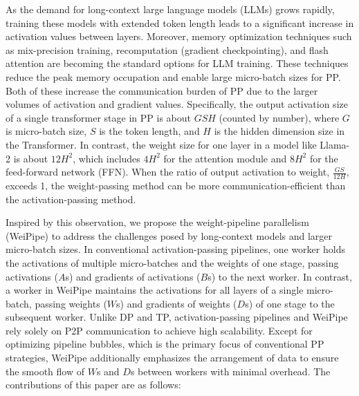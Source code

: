 \documentclass[sigplan,review]{acmart}
\begin{document}
As the demand for long-context large language models (LLMs) grows rapidly, training these models with extended token length leads to a significant increase in activation values between layers. Moreover, memory optimization techniques such as mix-precision training\cite{micikevicius2018mixedprecisiontraining}, recomputation (gradient checkpointing), and flash attention are becoming the standard options for LLM training. These techniques reduce the peak memory occupation and enable large micro-batch sizes for PP. Both of these increase the communication burden of PP due to the larger volumes of activation and gradient values. Specifically, the output activation size of a single transformer stage in PP is about $GSH$ (counted by number), where $G$ is micro-batch size, $S$ is the token length, and $H$ is the hidden dimension size in the Transformer. In contrast, the weight size for one layer in a model like Llama-2 is about $12H^2$, which includes $4H^2$ for the attention module and $8H^2$ for the feed-forward network (FFN). When the ratio of output activation to weight, $\frac{GS}{12H}$, exceeds 1, the weight-passing method can be more communication-efficient than the activation-passing method.

Inspired by this observation, we propose the weight-pipeline parallelism (WeiPipe) to address the challenges posed by long-context models and larger micro-batch sizes. In conventional activation-passing pipelines, one worker holds the activations of multiple micro-batches and the weights of one stage, passing activations ($A$s) and gradients of activations ($B$s) to the next worker. In contrast, a worker in WeiPipe maintains the activations for all layers of a single micro-batch, passing weights ($W$s) and gradients of weights ($D$s) of one stage to the subsequent worker. Unlike DP and TP, activation-passing pipelines and WeiPipe rely solely on P2P communication to achieve high scalability. Except for optimizing pipeline bubbles, which is the primary focus of conventional PP strategies, WeiPipe additionally emphasizes the arrangement of data to ensure the smooth flow of $W$s and $D$s between workers with minimal overhead. The contributions of this paper are as follows:
\end{document}
